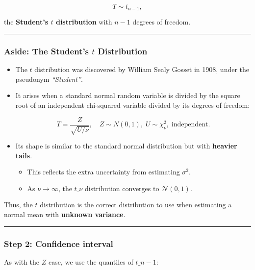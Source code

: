 \documentclass[
  letterpaper,
  DIV=11,
  numbers=noendperiod]{scrreprt}
\providecommand{\tightlist}{%
  \setlength{\itemsep}{0pt}\setlength{\parskip}{0pt}}
\theoremstyle{definition}
\theoremstyle{plain}
\theoremstyle{definition}
\theoremstyle{remark}
\begin{document}
\[
T \sim t_{n-1},
\]

the \textbf{Student's \(t\) distribution} with \(n-1\) degrees of
freedom.

\begin{center}\rule{0.5\linewidth}{0.5pt}\end{center}

\subsubsection{\texorpdfstring{Aside: The Student's \(t\)
Distribution}{Aside: The Student's t Distribution}}\label{aside-the-students-t-distribution}

\begin{itemize}
\item
  The \(t\) distribution was discovered by William Sealy Gosset in 1908,
  under the pseudonym \emph{``Student''}.
\item
  It arises when a standard normal random variable is divided by the
  square root of an independent chi-squared variable divided by its
  degrees of freedom:

  \[
  T = \frac{Z}{\sqrt{U/\nu}}, \quad Z \sim N(0,1), \; U \sim \chi^2_\nu, \; \text{independent}.
  \]
\item
  Its shape is similar to the standard normal distribution but with
  \textbf{heavier tails}.

  \begin{itemize}
  \tightlist
  \item
    This reflects the extra uncertainty from estimating \(\sigma^2\).
  \item
    As \(\nu \to \infty\), the \(t\_\nu\) distribution converges to
    \(\mathcal{N}(0,1)\).
  \end{itemize}
\end{itemize}

Thus, the \(t\) distribution is the correct distribution to use when
estimating a normal mean with \textbf{unknown variance}.

\begin{center}\rule{0.5\linewidth}{0.5pt}\end{center}

\subsubsection{Step 2: Confidence
interval}\label{step-2-confidence-interval}

As with the \(Z\) case, we use the quantiles of \(t\_{n-1}\):
\end{document}
